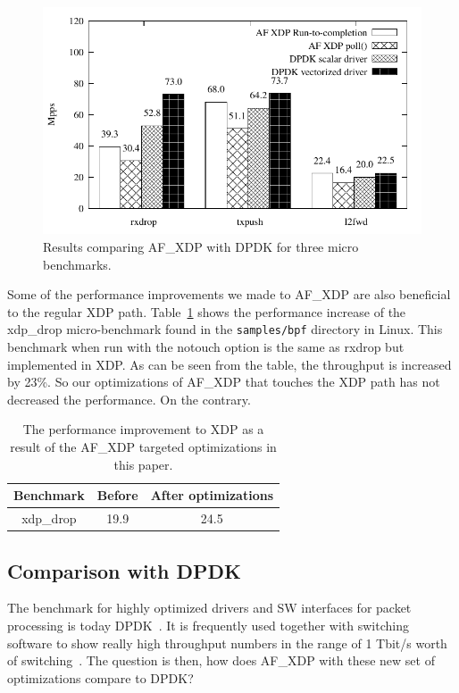 \documentclass[9pt,numbers,reprint]{sigplanconf}
\begin{document}
\begin{figure}[ht]
\centering
\includegraphics{results_dpdk.pdf}
\caption{Results comparing AF\_XDP with DPDK for three micro benchmarks.}
\label{fig:results_dpdk}
\end{figure}

% 

Some of the performance improvements we made to AF\_XDP are also
beneficial to the regular XDP path. Table~\ref{table:results_xdp}
shows the performance increase of the xdp\_drop micro-benchmark found
in the \texttt{samples/bpf} directory in Linux. This benchmark when run
with the notouch option is the same as rxdrop but implemented in
XDP. As can be seen from the table, the throughput is increased by
23\%. So our optimizations of AF\_XDP that touches the XDP path has
not decreased the performance. On the contrary.

\begin{table}[ht]
\centering
\begin{tabular}{|c|c|c|} \hline
\textbf{Benchmark} & \textbf{Before} & \textbf{After optimizations} \\ \hline
xdp\_drop & 19.9 & 24.5 \\ \hline
\end{tabular}
\caption{The performance improvement to XDP as a result of the AF\_XDP
  targeted optimizations in this paper.}
\label{table:results_xdp}
\end{table}


\subsection{Comparison with DPDK}
\label{sec:exp:dpdkres}

The benchmark for highly optimized drivers and SW interfaces for
packet processing is today DPDK~\cite{dpdk}. It is frequently used
together with switching software to show really high throughput
numbers in the range of 1 Tbit/s worth of
switching~\cite{fdio_one_tbits}. The question is then, how does
AF\_XDP with these new set of optimizations compare to DPDK?
\end{document}
